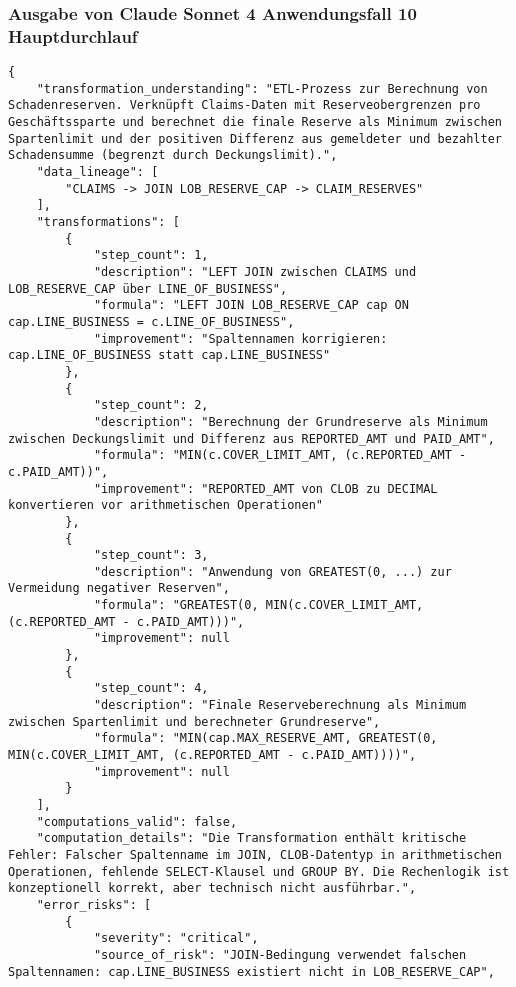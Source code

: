 \subsubsection{Ausgabe von Claude Sonnet 4 Anwendungsfall 10 Hauptdurchlauf}\label{anhang:subsubsec:claude_case10_prompt1}
\begin{lstlisting}[caption={Ausgabe: Claude Sonnet 4 Anwendungsfall 10 Hauptdurchlauf},label={claude_case10_prompt1}]
{
    "transformation_understanding": "ETL-Prozess zur Berechnung von Schadenreserven. Verknüpft Claims-Daten mit Reserveobergrenzen pro Geschäftssparte und berechnet die finale Reserve als Minimum zwischen Spartenlimit und der positiven Differenz aus gemeldeter und bezahlter Schadensumme (begrenzt durch Deckungslimit).",
    "data_lineage": [
        "CLAIMS -> JOIN LOB_RESERVE_CAP -> CLAIM_RESERVES"
    ],
    "transformations": [
        {
            "step_count": 1,
            "description": "LEFT JOIN zwischen CLAIMS und LOB_RESERVE_CAP über LINE_OF_BUSINESS",
            "formula": "LEFT JOIN LOB_RESERVE_CAP cap ON cap.LINE_BUSINESS = c.LINE_OF_BUSINESS",
            "improvement": "Spaltennamen korrigieren: cap.LINE_OF_BUSINESS statt cap.LINE_BUSINESS"
        },
        {
            "step_count": 2,
            "description": "Berechnung der Grundreserve als Minimum zwischen Deckungslimit und Differenz aus REPORTED_AMT und PAID_AMT",
            "formula": "MIN(c.COVER_LIMIT_AMT, (c.REPORTED_AMT - c.PAID_AMT))",
            "improvement": "REPORTED_AMT von CLOB zu DECIMAL konvertieren vor arithmetischen Operationen"
        },
        {
            "step_count": 3,
            "description": "Anwendung von GREATEST(0, ...) zur Vermeidung negativer Reserven",
            "formula": "GREATEST(0, MIN(c.COVER_LIMIT_AMT, (c.REPORTED_AMT - c.PAID_AMT)))",
            "improvement": null
        },
        {
            "step_count": 4,
            "description": "Finale Reserveberechnung als Minimum zwischen Spartenlimit und berechneter Grundreserve",
            "formula": "MIN(cap.MAX_RESERVE_AMT, GREATEST(0, MIN(c.COVER_LIMIT_AMT, (c.REPORTED_AMT - c.PAID_AMT))))",
            "improvement": null
        }
    ],
    "computations_valid": false,
    "computation_details": "Die Transformation enthält kritische Fehler: Falscher Spaltenname im JOIN, CLOB-Datentyp in arithmetischen Operationen, fehlende SELECT-Klausel und GROUP BY. Die Rechenlogik ist konzeptionell korrekt, aber technisch nicht ausführbar.",
    "error_risks": [
        {
            "severity": "critical",
            "source_of_risk": "JOIN-Bedingung verwendet falschen Spaltennamen: cap.LINE_BUSINESS existiert nicht in LOB_RESERVE_CAP",

\end{lstlisting}
